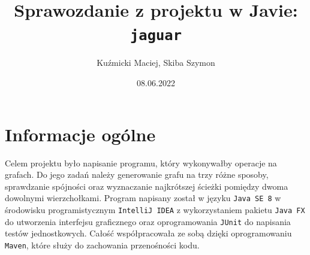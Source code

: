 \documentclass[]{article}
\title{Sprawozdanie z projektu w Javie: \texttt{jaguar}}
\author{Kuźmicki Maciej, Skiba Szymon}
\date{08.06.2022}
\begin{document}
\maketitle
\thispagestyle{fancy}
\section{Informacje ogólne}\label{header-n231}
Celem projektu było napisanie programu, który wykonywałby operacje na grafach. Do jego zadań należy generowanie grafu na trzy różne sposoby, sprawdzanie spójności oraz wyznaczanie najkrótszej ścieżki pomiędzy dwoma dowolnymi wierzchołkami. Program napisany został w języku \texttt{Java SE 8} w środowisku programistycznym \texttt{IntelliJ IDEA} z wykorzystaniem pakietu \texttt{Java FX} do utworzenia interfejsu graficznego oraz oprogramowania \texttt{JUnit} do napisania testów jednostkowych. Całość współpracowała ze sobą dzięki oprogramowaniu \texttt{Maven}, które służy do zachowania przenośności kodu.
\end{document}
